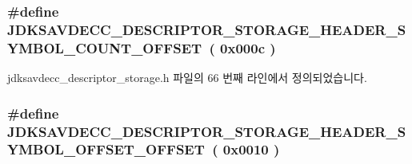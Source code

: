 \subsubsection[{\texorpdfstring{J\+D\+K\+S\+A\+V\+D\+E\+C\+C\+\_\+\+D\+E\+S\+C\+R\+I\+P\+T\+O\+R\+\_\+\+S\+T\+O\+R\+A\+G\+E\+\_\+\+H\+E\+A\+D\+E\+R\+\_\+\+S\+Y\+M\+B\+O\+L\+\_\+\+C\+O\+U\+N\+T\+\_\+\+O\+F\+F\+S\+ET}{JDKSAVDECC_DESCRIPTOR_STORAGE_HEADER_SYMBOL_COUNT_OFFSET}}]{\setlength{\rightskip}{0pt plus 5cm}\#define J\+D\+K\+S\+A\+V\+D\+E\+C\+C\+\_\+\+D\+E\+S\+C\+R\+I\+P\+T\+O\+R\+\_\+\+S\+T\+O\+R\+A\+G\+E\+\_\+\+H\+E\+A\+D\+E\+R\+\_\+\+S\+Y\+M\+B\+O\+L\+\_\+\+C\+O\+U\+N\+T\+\_\+\+O\+F\+F\+S\+ET~( 0x000c )}\hypertarget{group__descriptor__storage__header_ga8f599a40045785cffa37c361f8653e54}{}\label{group__descriptor__storage__header_ga8f599a40045785cffa37c361f8653e54}


jdksavdecc\+\_\+descriptor\+\_\+storage.\+h 파일의 66 번째 라인에서 정의되었습니다.

\subsubsection[{\texorpdfstring{J\+D\+K\+S\+A\+V\+D\+E\+C\+C\+\_\+\+D\+E\+S\+C\+R\+I\+P\+T\+O\+R\+\_\+\+S\+T\+O\+R\+A\+G\+E\+\_\+\+H\+E\+A\+D\+E\+R\+\_\+\+S\+Y\+M\+B\+O\+L\+\_\+\+O\+F\+F\+S\+E\+T\+\_\+\+O\+F\+F\+S\+ET}{JDKSAVDECC_DESCRIPTOR_STORAGE_HEADER_SYMBOL_OFFSET_OFFSET}}]{\setlength{\rightskip}{0pt plus 5cm}\#define J\+D\+K\+S\+A\+V\+D\+E\+C\+C\+\_\+\+D\+E\+S\+C\+R\+I\+P\+T\+O\+R\+\_\+\+S\+T\+O\+R\+A\+G\+E\+\_\+\+H\+E\+A\+D\+E\+R\+\_\+\+S\+Y\+M\+B\+O\+L\+\_\+\+O\+F\+F\+S\+E\+T\+\_\+\+O\+F\+F\+S\+ET~( 0x0010 )}\hypertarget{group__descriptor__storage__header_gabc3e6fbd3eea04b517b3bca6256ff67f}{}\label{group__descriptor__storage__header_gabc3e6fbd3eea04b517b3bca6256ff67f}


